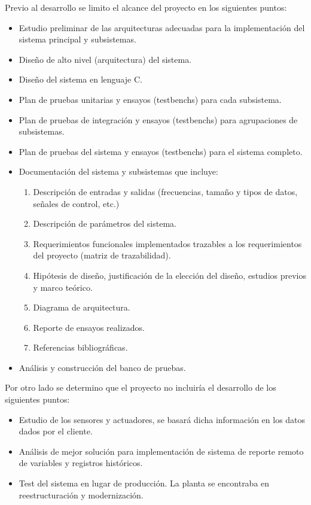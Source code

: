 Previo al desarrollo se limito el alcance del proyecto en los siguientes puntos:
\begin{itemize}
	\item Estudio preliminar de las arquitecturas adecuadas para la implementación del sistema principal y subsistemas.
	\item Diseño de alto nivel (arquitectura) del sistema.
	\item Diseño del sistema en lenguaje C.
	\item Plan de pruebas unitarias y ensayos (testbenchs) para cada subsistema.
	\item Plan de pruebas de integración y ensayos (testbenchs) para agrupaciones de subsistemas.
	\item Plan de pruebas del sistema y ensayos (testbenchs) para el sistema completo.
	\item Documentación del sistema y subsistemas que incluye:
	\begin{enumerate}
		\item Descripción de entradas y salidas (frecuencias, tamaño y tipos de datos, señales de control, etc.)
		\item Descripción de parámetros del sistema.
		\item Requerimientos funcionales implementados trazables a los requerimientos del proyecto (matriz de trazabilidad).
		\item Hipótesis de diseño, justificación de la elección del diseño, estudios previos y marco teórico.
		\item Diagrama de arquitectura.
		\item Reporte de ensayos realizados.
		\item Referencias bibliográficas.
	\end{enumerate}
	\item Análisis y construcción del banco de pruebas.
\end{itemize}

Por otro lado se determino que el proyecto no incluiría el desarrollo de los siguientes puntos: 
\begin{itemize}
	\item Estudio de los sensores y actuadores, se basará dicha información en los datos dados por el cliente. 
	\item Análisis de mejor solución para implementación de sistema de reporte remoto de variables y registros históricos. 
	\item Test del sistema en lugar de producción. La planta se encontraba en reestructuración y modernización.
\end{itemize}








